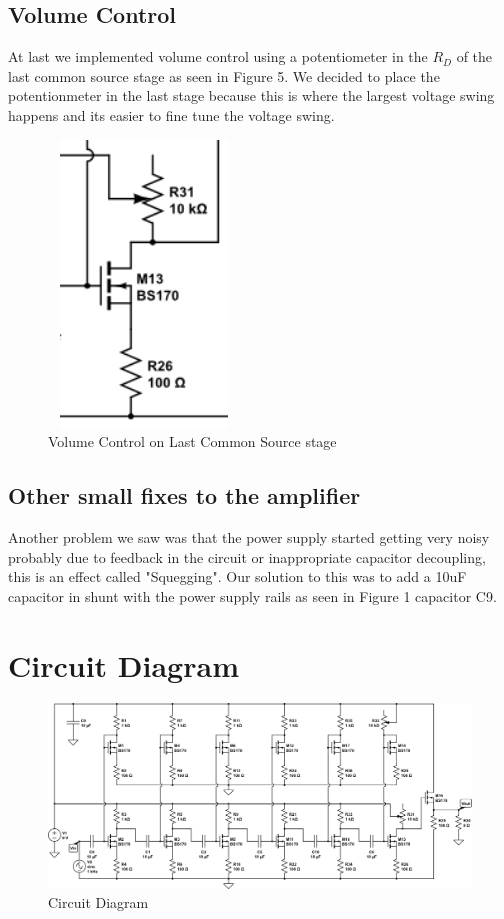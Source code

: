 \documentclass[11pt, twoside, letterpaper]{article}
\begin{document}
\subsection{Volume Control}
At last we implemented volume control using a potentiometer in the $R_D$ of the last common source stage as seen in Figure 5. We decided
to place the potentionmeter in the last stage because this is where the largest voltage swing happens and its easier to fine tune the 
voltage swing.

\begin{figure}[htbp]
\begin{center}
\includegraphics[width=2in,height=3in]{VolumeControl.png}
\caption{Volume Control on Last Common Source stage}
\end{center}
\end{figure}
\FloatBarrier

\subsection{Other small fixes to the amplifier}
Another problem we saw was that the power supply started getting very noisy probably due to feedback in the circuit or inappropriate capacitor
decoupling, this is an effect called "Squegging". Our solution to this was to add a 10uF capacitor in shunt with the power supply rails as 
seen in Figure 1 capacitor C9.
\newpage 

\section{Circuit Diagram}
\begin{figure}[htbp]
	\begin{center}
		\includegraphics[scale=0.80,angle=-90]{circuitdiagram.png}
		\caption{Circuit Diagram}
	\end{center}
\end{figure}
\FloatBarrier
\newpage
\end{document}
